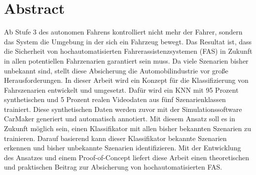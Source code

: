 

\chapter*{Abstract}

Ab Stufe 3 des autonomen Fahrens kontrolliert nicht mehr der Fahrer, sondern das System die Umgebung in der sich ein Fahrzeug bewegt. Das Resultat ist, dass die Sicherheit von hochautomatisierten Fahrerassistenzsystemen (\acs{FAS}) in Zukunft in allen potentiellen Fahrzenarien garantiert sein muss. Da viele Szenarien bisher unbekannt sind, stellt diese Absicherung die Automobilindustrie vor große Herausforderungen. In dieser Arbeit wird ein Konzept für die Klassifizierung von Fahrszenarien entwickelt und umgesetzt. Dafür wird ein \ac{KNN} mit 95 Prozent synthetischen und 5 Prozent realen Videodaten aus fünf Szenarienklassen trainiert. Diese synthetischen Daten werden zuvor mit der Simulationssoftware CarMaker generiert und automatisch annotiert. Mit diesem Ansatz soll es in Zukunft möglich sein, einen Klassifikator mit allen bisher bekannten Szenarien zu trainieren. Darauf basierend kann dieser Klassifikator bekannte Szenarien erkennen und bisher unbekannte Szenarien identifizieren. Mit der Entwicklung des Ansatzes und einem Proof-of-Concept liefert diese Arbeit einen theoretischen und praktischen Beitrag zur Absicherung von hochautomatisierten \acs{FAS}.

